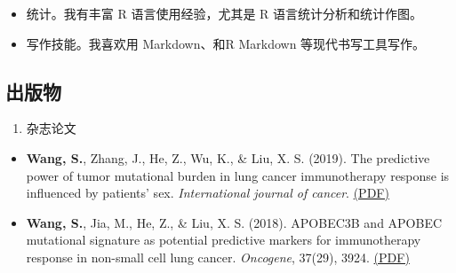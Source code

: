 \documentclass[10pt,]{article}
\providecommand{\tightlist}{%
  \setlength{\itemsep}{0pt}\setlength{\parskip}{0pt}}
\begin{document}
\begin{itemize}
\tightlist
\item
  统计。我有丰富 R 语言使用经验，尤其是 R 语言统计分析和统计作图。
\item
  写作技能。我喜欢用 Markdown、和R Markdown 等现代书写工具写作。
\end{itemize}

\subsection{出版物}

\begin{enumerate}
\def\labelenumi{\arabic{enumi}.}
\tightlist
\item
  杂志论文
\end{enumerate}

\begin{itemize}
\tightlist
\item
  \textbf{Wang, S.}, Zhang, J., He, Z., Wu, K., \& Liu, X. S. (2019).
  The predictive power of tumor mutational burden in lung cancer
  immunotherapy response is influenced by patients' sex.
  \emph{International journal of cancer}.
  \href{https://www.researchgate.net/publication/332372671_The_predictive_power_of_tumor_mutational_burden_in_lung_cancer_immunotherapy_response_is_influenced_by_patients'_sex}{(PDF)}
\item
  \textbf{Wang, S.}, Jia, M., He, Z., \& Liu, X. S. (2018). APOBEC3B and
  APOBEC mutational signature as potential predictive markers for
  immunotherapy response in non-small cell lung cancer. \emph{Oncogene},
  37(29), 3924.
  \href{https://www.researchgate.net/publication/324781475_APOBEC3B_and_APOBEC_mutational_signature_as_potential_predictive_markers_for_immunotherapy_response_in_non-small_cell_lung_cancer}{(PDF)}
\end{itemize}
\end{document}
